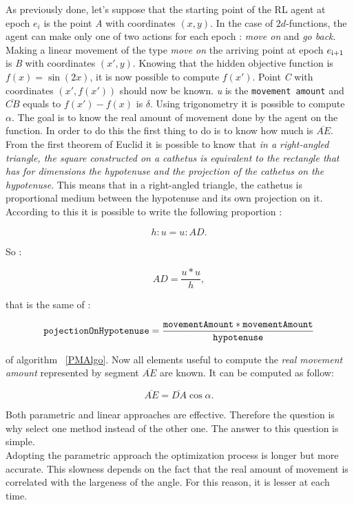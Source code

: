 As previously done, let's suppose that the starting point of the RL agent at epoch $e_i$ is the point \textit{A} with coordinates $(x, y)$. In the case of $2d$-functions, the agent can make only one of two actions for each epoch : \textit{move on} and \textit{go back}. Making a linear movement of the type \textit{move on} the arriving point at epoch $e\textsubscript{i+1}$ is \textit{B} with coordinates $(x', y)$. Knowing that the hidden objective function is $f(x) = \sin(2x)$, it is now possible to compute $f(x')$. Point \textit{C} with coordinates $(x', f(x'))$ should now be known. \textit{u} is the {\tt movement amount} and $\overline{CB}$  equals to $f(x') - f(x)$ is $\delta$. Using trigonometry it is possible to compute $\alpha$. The goal is to know the real amount of movement done by the agent on the function. In order to do this the first thing to do is to know how much is $\overline{AE}$.  From the first theorem of Euclid it is possible to know that \textit{in a right-angled triangle, the square constructed on a cathetus is equivalent to the rectangle that has for dimensions the hypotenuse and the projection of the cathetus on the hypotenuse}. This means that in a right-angled triangle, the cathetus is proportional medium between the hypotenuse and its own projection on it. According to this it is possible to write the following proportion :

\begin{equation}
	h : u =  u : AD.
\end{equation}

So :

\begin{equation}
	AD = \dfrac{u * u}{h},
\end{equation}

that is the same of :

\begin{equation}
	 {\tt pojectionOnHypotenuse} = \dfrac{{\tt movementAmount} * {\tt movementAmount}}{{\tt hypotenuse}}
\end{equation}

of algorithm ~\ref{PMAlgo}. Now all elements useful to compute the \textit{real movement amount} represented by segment $\overline{AE}$ are known. It can be computed as follow:

\begin{equation}
	\overline{AE} = \overline{DA} \cos \alpha.
\end{equation}

Both parametric and linear approaches are effective. Therefore the question is why select one method instead of the other one. The answer to this question is simple. \\ Adopting the parametric approach the optimization process is longer but more accurate. This slowness depends on the fact that the real amount of movement is correlated with the largeness of the angle. For this reason, it is lesser at each time. 


